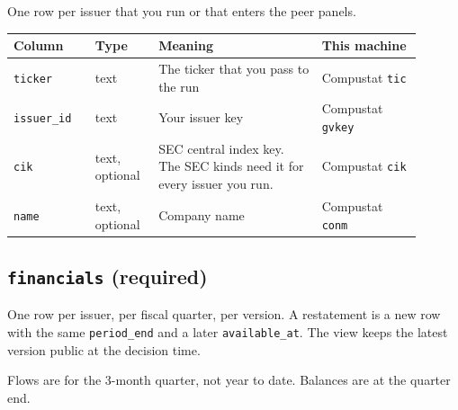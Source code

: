 \documentclass[10.5pt,a4paper]{article}
\newcommand{\code}[1]{\texttt{\small #1}}
\begin{document}
One row per issuer that you run or that enters the peer panels.

\begin{longtable}{@{}>{\raggedright\arraybackslash}p{0.180\linewidth}>{\raggedright\arraybackslash}p{0.135\linewidth}>{\raggedright\arraybackslash}p{0.360\linewidth}>{\raggedright\arraybackslash}p{0.225\linewidth}@{}}
\toprule
\textbf{Column} & \textbf{Type} & \textbf{Meaning} & \textbf{This machine}\\
\midrule
\endhead
\code{ticker} & text & The ticker that you pass to the run & Compustat \code{tic}\\
\code{issuer\_\allowbreak{}id} & text & Your issuer key & Compustat \code{gvkey}\\
\code{cik} & text, optional & SEC central index key. The SEC kinds need it for every issuer you run. & Compustat \code{cik}\\
\code{name} & text, optional & Company name & Compustat \code{conm}\\
\bottomrule
\end{longtable}

\subsection{\code{financials} (required)}

One row per issuer, per fiscal quarter, per version. A restatement is a new row with the same \code{period\_\allowbreak{}end} and a later \code{available\_\allowbreak{}at}. The view keeps the latest version public at the decision time.

Flows are for the 3-month quarter, not year to date. Balances are at the quarter end.
\end{document}
